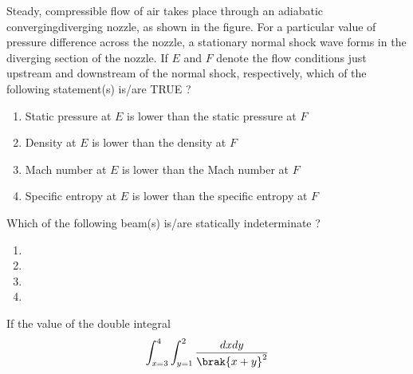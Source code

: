 \iffalse
\chapter{2024}
\author{AI24BTECH11009}
\section{me}
\fi

\item Steady, compressible flow of air takes place through an adiabatic convergingdiverging nozzle, as shown in the figure. For a particular value of pressure difference across the nozzle, a stationary normal shock wave forms in the diverging section of the nozzle. If $E$ and $F$ denote the flow conditions just upstream and downstream of the normal shock, respectively, which of the following statement(s) is/are TRUE ?
\begin{figure}[!ht]
\centering
\resizebox{0.7\textwidth}{!}{%

}%
\end{figure}
\begin{enumerate}
    \item Static pressure at $E$ is lower than the static pressure at $F$
    \item Density at $E$ is lower than the density at $F$
    \item Mach number at $E$ is lower than the Mach number at $F$
    \item Specific entropy at $E$ is lower than the specific entropy at $F$ \\
\end{enumerate}
\item Which of the following beam(s) is/are statically indeterminate ?
\begin{enumerate}
    \item \resizebox{0.4\textwidth}{!}{%

}%
\item \resizebox{0.45\textwidth}{!}{%

}%
\item \resizebox{0.4\textwidth}{!}{%

}%
\item \resizebox{0.4\textwidth}{!}{%

}%
\end{enumerate}
\item If the value of the double integral
\begin{align*}
    \int_{x=3}^{4}\int_{y=1}^{2} \frac{dxdy}{\brak{x + y}^2}
\end{align*}
